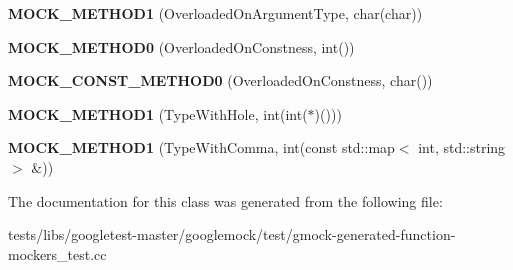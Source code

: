 \begin{DoxyCompactItemize}
{\bfseries M\+O\+C\+K\+\_\+\+M\+E\+T\+H\+O\+D1} (Overloaded\+On\+Argument\+Type, char(char))
\item 
\mbox{\label{classtesting_1_1gmock__generated__function__mockers__test_1_1MockFoo_a291ff46b043d00d0f0acb081c5c36f2e}} 
{\bfseries M\+O\+C\+K\+\_\+\+M\+E\+T\+H\+O\+D0} (Overloaded\+On\+Constness, int())
\item 
\mbox{\label{classtesting_1_1gmock__generated__function__mockers__test_1_1MockFoo_aa0da575ad3061850662c5f401ddb30c2}} 
{\bfseries M\+O\+C\+K\+\_\+\+C\+O\+N\+S\+T\+\_\+\+M\+E\+T\+H\+O\+D0} (Overloaded\+On\+Constness, char())
\item 
\mbox{\label{classtesting_1_1gmock__generated__function__mockers__test_1_1MockFoo_a33077a71c1c5178c25b0a4aa099d5f2c}} 
{\bfseries M\+O\+C\+K\+\_\+\+M\+E\+T\+H\+O\+D1} (Type\+With\+Hole, int(int($\ast$)()))
\item 
\mbox{\label{classtesting_1_1gmock__generated__function__mockers__test_1_1MockFoo_a3774adcc0155dd4c3b5fd790a6f40261}} 
{\bfseries M\+O\+C\+K\+\_\+\+M\+E\+T\+H\+O\+D1} (Type\+With\+Comma, int(const std\+::map$<$ int, std\+::string $>$ \&))
\end{DoxyCompactItemize}


The documentation for this class was generated from the following file\+:\begin{DoxyCompactItemize}
\item 
tests/libs/googletest-\/master/googlemock/test/gmock-\/generated-\/function-\/mockers\+\_\+test.\+cc\end{DoxyCompactItemize}
